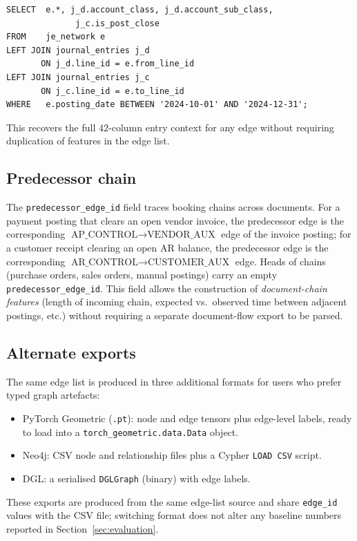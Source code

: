 \begin{verbatim}
SELECT  e.*, j_d.account_class, j_d.account_sub_class,
              j_c.is_post_close
FROM    je_network e
LEFT JOIN journal_entries j_d
       ON j_d.line_id = e.from_line_id
LEFT JOIN journal_entries j_c
       ON j_c.line_id = e.to_line_id
WHERE   e.posting_date BETWEEN '2024-10-01' AND '2024-12-31';
\end{verbatim}

This recovers the full $42$-column entry context for any edge
without requiring duplication of features in the edge list.

\subsection{Predecessor chain}
\label{sec:graph:predecessor}

The \texttt{predecessor\_edge\_id} field traces booking chains across
documents.  For a payment posting that clears an open vendor
invoice, the predecessor edge is the corresponding
$\text{AP\_CONTROL} \to \text{VENDOR\_AUX}$ edge of the invoice
posting; for a customer receipt clearing an open AR balance, the
predecessor edge is the corresponding
$\text{AR\_CONTROL} \to \text{CUSTOMER\_AUX}$ edge.  Heads of chains
(purchase orders, sales orders, manual postings) carry an empty
\texttt{predecessor\_edge\_id}.  This field allows the construction
of \emph{document-chain features} (length of incoming chain,
expected vs.\ observed time between adjacent postings, etc.) without
requiring a separate document-flow export to be parsed.

\subsection{Alternate exports}
\label{sec:graph:alternate}

The same edge list is produced in three additional formats
for users who prefer typed graph artefacts:

\begin{itemize}
  \item PyTorch Geometric (\texttt{.pt}): node and edge tensors
    plus edge-level labels, ready to load into a
    \texttt{torch\_geometric.data.Data} object.
  \item Neo4j: CSV node and relationship files plus a Cypher
    \texttt{LOAD CSV} script.
  \item DGL: a serialised \texttt{DGLGraph} (binary) with edge
    labels.
\end{itemize}

These exports are produced from the same edge-list source and
share \texttt{edge\_id} values with the CSV file; switching format
does not alter any baseline numbers reported in
Section~\ref{sec:evaluation}.
